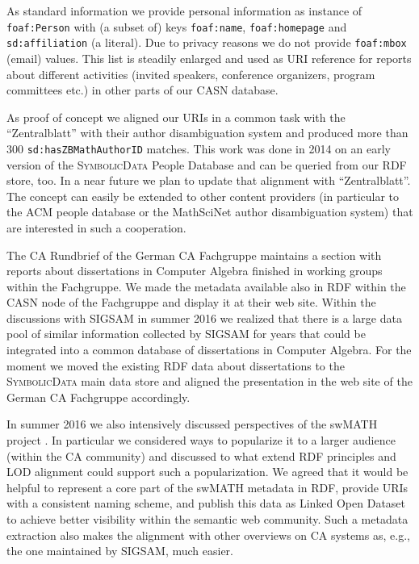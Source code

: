 \documentclass[a4paper,11pt]{article}
\def\SD{\textsc{Symbolic\-Data}}
\begin{document}
\begin{multicols}{2}
As standard information we provide personal information as instance of
\texttt{foaf:Person} with (a subset of) keys \texttt{foaf:name},
\texttt{foaf:homepage} and \texttt{sd:affiliation} (a literal). Due to privacy
reasons we do not provide \texttt{foaf:mbox} (email) values.  This list is
steadily enlarged and used as URI reference for reports about different
activities (invited speakers, conference organizers, program committees etc.)
in other parts of our CASN database.

As proof of concept we aligned our URIs in a common task with the
``Zentralblatt'' with their author disambiguation system and produced more
than 300 \texttt{sd:hasZBMathAuthorID} matches. This work was done in 2014 on
an early version of the {\SD} People Database and can be queried from our RDF
store, too.  In a near future we plan to update that alignment with
``Zentralblatt''.  The concept can easily be extended to other content
providers (in particular to the ACM people database or the MathSciNet author
disambiguation system) that are interested in such a cooperation.


The CA Rundbrief of the German CA Fachgruppe maintains a section with reports
about dissertations in Computer Algebra finished in working groups within the
Fachgruppe.  We made the metadata available also in RDF within the CASN node
of the Fachgruppe and display it at their web site.  Within the discussions
with SIGSAM in summer 2016 we realized that there is a large data pool of
similar information collected by SIGSAM for years that could be integrated
into a common database of dissertations in Computer Algebra. For the moment we
moved the existing RDF data about dissertations to the {\SD} main data store
and aligned the presentation in the web site of the German CA Fachgruppe
accordingly.


In summer 2016 we also intensively discussed perspectives of the swMATH
project \cite{swmath}. In particular we considered ways to popularize it to a
larger audience (within the CA community) and discussed to what extend RDF
principles and LOD alignment could support such a popularization.  We agreed
that it would be helpful to represent a core part of the swMATH metadata in
RDF, provide URIs with a consistent naming scheme, and publish this data as
Linked Open Dataset to achieve better visibility within the semantic web
community.  Such a metadata extraction also makes the alignment with other
overviews on CA systems as, e.g., the one maintained by SIGSAM, much easier.


\end{multicols}
\end{document}
